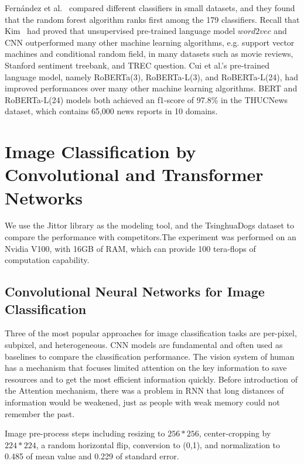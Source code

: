 \documentclass[runningheads]{llncs}
\begin{document}
  Fern{\'a}ndez et al.~\cite{fernandez2014we} compared different classifiers in small datasets, and they found that the random forest algorithm ranks first among the 179 classifiers.
  Recall that Kim~\cite{kim2014convolutional} had proved that unsupervised pre-trained language model $word2vec$ and CNN outperformed many other machine learning algorithms,
e.g. support vector machines and conditional random field, in many datasets such as movie reviews, Stanford sentiment treebank, and TREC question.
Cui et al.'s pre-trained language model, namely RoBERTa(3), RoBERTa-L(3), and RoBERTa-L(24), had improved performances over many other machine learning algorithms.
BERT and RoBERTa-L(24) models both achieved an f1-score of 97.8\% in the THUCNews dataset, which contains 65,000 news reports in 10 domains.


\section{Image Classification by Convolutional and Transformer Networks}

We use the Jittor\cite{hu2020jittor} library as the modeling tool, and the TsinghuaDogs\cite{Zou2020TsinghuaDogs} dataset to compare the performance with competitors.The experiment was performed on an Nvidia V100, with 16GB of RAM,
which can provide 100 tera-flops of computation capability.

\subsection{Convolutional Neural Networks for Image Classification}

\par Three of the most popular approaches for image classification tasks are per-pixel, subpixel, and heterogeneous.
CNN models are fundamental and often used as baselines to compare the classification performance.
The vision system of human has a mechanism that focuses limited attention on the key information to save resources and to get the most efficient information quickly.
Before introduction of the Attention mechanism, there was a problem in RNN that long distances of information would be weakened,
just as people with weak memory could not remember the past.

\par Image pre-process steps including resizing to $256*256$, center-cropping by $224*224$, a random horizontal flip, conversion to (0,1), and normalization to 0.485 of mean value and 0.229 of standard error.
\end{document}

